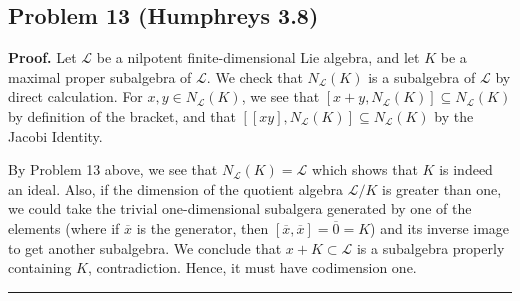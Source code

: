 \documentclass[12pt]{article}%
\newenvironment{proof}[1][Proof]{\textbf{#1.} }{\ \rule{0.5em}{0.5em}}
\begin{document}
    \subsection*{Problem 13 (Humphreys 3.8)}
      \begin{proof}
        Let $\mathcal{L}$ be a nilpotent finite-dimensional Lie algebra, and let $K$ be a maximal proper subalgebra of $\mathcal{L}$. We check that $N_{\mathcal{L}}(K)$ is a subalgebra of $\mathcal{L}$ by direct calculation. For $x,y \in N_{\mathcal{L}}(K)$, we see that $[x+y,N_{\mathcal{L}}(K)] \subseteq N_{\mathcal{L}}(K)$ by definition of the bracket, and that $[[xy],N_{\mathcal{L}}(K)] \subseteq N_{\mathcal{L}}(K)$ by the Jacobi Identity. \par

        By Problem 13 above, we see that $N_{\mathcal{L}}(K) = \mathcal{L}$ which shows that $K$ is indeed an ideal. Also, if the dimension of the quotient algebra $\mathcal{L} / K$ is greater than one, we could take the trivial one-dimensional subalgera generated by one of the elements (where if $\overline{x}$ is the generator, then $[\overline{x},\overline{x}] = \overline{0} = K$) and its inverse image to get another subalgebra. We conclude that $x + K \subset \mathcal{L}$ is a subalgebra properly containing $K$, contradiction. Hence, it must have codimension one.
      \end{proof}
\end{document}
